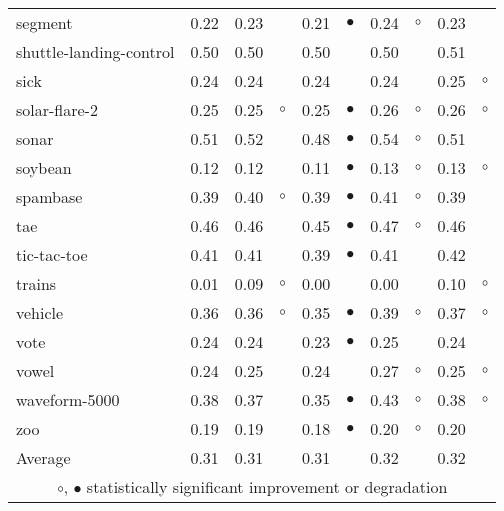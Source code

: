 \begin{table}[thb]
{\begin{tabular}{lrr@{\hspace{0.1cm}}cr@{\hspace{0.1cm}}cr@{\hspace{0.1cm}}cr@{\hspace{0.1cm}}c}
segment & 0.22 & 0.23 &           & 0.21 & $\bullet$ & 0.24 &   $\circ$ & 0.23 &          \\
shuttle-landing-control & 0.50 & 0.50 &           & 0.50 &           & 0.50 &           & 0.51 &          \\
sick & 0.24 & 0.24 &           & 0.24 &           & 0.24 &           & 0.25 &   $\circ$\\
solar-flare-2 & 0.25 & 0.25 &   $\circ$ & 0.25 & $\bullet$ & 0.26 &   $\circ$ & 0.26 &   $\circ$\\
sonar & 0.51 & 0.52 &           & 0.48 & $\bullet$ & 0.54 &   $\circ$ & 0.51 &          \\
soybean & 0.12 & 0.12 &           & 0.11 & $\bullet$ & 0.13 &   $\circ$ & 0.13 &   $\circ$\\
spambase & 0.39 & 0.40 &   $\circ$ & 0.39 & $\bullet$ & 0.41 &   $\circ$ & 0.39 &          \\
tae & 0.46 & 0.46 &           & 0.45 & $\bullet$ & 0.47 &   $\circ$ & 0.46 &          \\
tic-tac-toe & 0.41 & 0.41 &           & 0.39 & $\bullet$ & 0.41 &           & 0.42 &          \\
trains & 0.01 & 0.09 &   $\circ$ & 0.00 &           & 0.00 &           & 0.10 &   $\circ$\\
vehicle & 0.36 & 0.36 &   $\circ$ & 0.35 & $\bullet$ & 0.39 &   $\circ$ & 0.37 &   $\circ$\\
vote & 0.24 & 0.24 &           & 0.23 & $\bullet$ & 0.25 &           & 0.24 &          \\
vowel & 0.24 & 0.25 &           & 0.24 &           & 0.27 &   $\circ$ & 0.25 &   $\circ$\\
waveform-5000 & 0.38 & 0.37 &           & 0.35 & $\bullet$ & 0.43 &   $\circ$ & 0.38 &   $\circ$\\
zoo & 0.19 & 0.19 &           & 0.18 & $\bullet$ & 0.20 &   $\circ$ & 0.20 &          \\
\hline
Average & 0.31 & 0.31 &           & 0.31 &           & 0.32 &           & 0.32 &          \\
\hline
\multicolumn{10}{c}{$\circ$, $\bullet$ statistically significant improvement or degradation}\\
\end{tabular} \footnotesize \par}
\end{table}